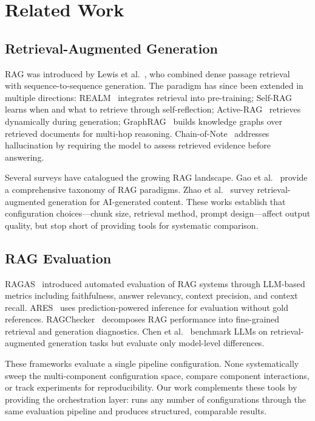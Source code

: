 \section{Related Work}
\label{sec:related}

\subsection{Retrieval-Augmented Generation}

RAG was introduced by Lewis et al.~\cite{lewis2020retrieval}, who combined dense passage retrieval~\cite{karpukhin2020dense} with sequence-to-sequence generation. The paradigm has since been extended in multiple directions: REALM~\cite{guu2020realm} integrates retrieval into pre-training; Self-RAG~\cite{asai2024selfrag} learns when and what to retrieve through self-reflection; Active-RAG~\cite{jiang2024active} retrieves dynamically during generation; GraphRAG~\cite{edge2024local} builds knowledge graphs over retrieved documents for multi-hop reasoning. Chain-of-Note~\cite{li2024chain} addresses hallucination by requiring the model to assess retrieved evidence before answering.

Several surveys have catalogued the growing RAG landscape. Gao et al.~\cite{gao2024retrieval} provide a comprehensive taxonomy of RAG paradigms. Zhao et al.~\cite{zhao2024retrieval} survey retrieval-augmented generation for AI-generated content. These works establish that configuration choices---chunk size, retrieval method, prompt design---affect output quality, but stop short of providing tools for systematic comparison.

\subsection{RAG Evaluation}

RAGAS~\cite{es2023ragas} introduced automated evaluation of RAG systems through LLM-based metrics including faithfulness, answer relevancy, context precision, and context recall. ARES~\cite{esphandiary2024areval} uses prediction-powered inference for evaluation without gold references. RAGChecker~\cite{izrailovsky2024rag} decomposes RAG performance into fine-grained retrieval and generation diagnostics. Chen et al.~\cite{chen2024benchmarking} benchmark LLMs on retrieval-augmented generation tasks but evaluate only model-level differences.

These frameworks evaluate a single pipeline configuration. None systematically sweep the multi-component configuration space, compare component interactions, or track experiments for reproducibility. Our work complements these tools by providing the orchestration layer: \toolname{} runs any number of configurations through the same evaluation pipeline and produces structured, comparable results.

